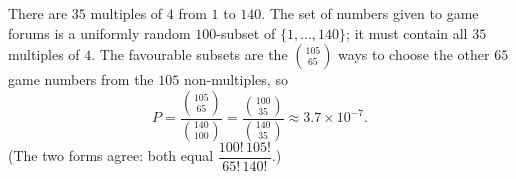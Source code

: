 There are $35$ multiples of $4$ from $1$ to $140$. The set of numbers given to game forums is a uniformly random $100$-subset of $\{1,\dots,140\}$; it must contain all $35$ multiples of $4$. The favourable subsets are the $\binom{105}{65}$ ways to choose the other $65$ game numbers from the $105$ non-multiples, so
\[P=\dfrac{\binom{105}{65}}{\binom{140}{100}}=\boxed{\dfrac{\binom{100}{35}}{\binom{140}{35}}}\approx 3.7\times10^{-7}.\]
(The two forms agree: both equal $\dfrac{100!\,105!}{65!\,140!}$.)
